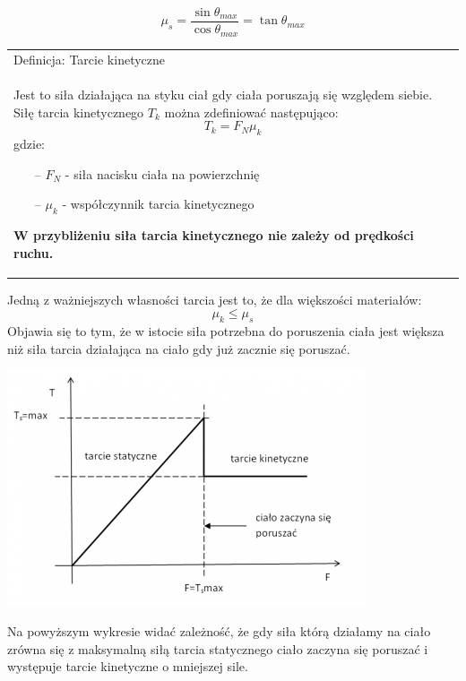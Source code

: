 \documentclass[a4paper]{article}
\newenvironment{definition}[2][Definicja]
    {
        \begin{center}
        \begin{tabular}{|p{1\textwidth}|}
        \hline
            #1: #2\\[2ex]
        \begin{em}
        \Large
    }
    { 
        \end{em}
        \\\hline
        \end{tabular} 
        \end{center}
    }
\begin{document}
    \[\mu_s = \frac{\sin \theta_{max}}{\cos \theta_{max}} = \tan{\theta_{max}}\] 
    \begin{definition}{Tarcie kinetyczne}
        Jest to siła działająca na styku ciał gdy ciała poruszają się względem siebie. Siłę 
        tarcia kinetycznego $T_k$ można zdefiniować następująco:
        \[T_k = F_N\mu_k\]
        gdzie:
        \begin{itemize}
            \item[--] $F_N$ - siła nacisku ciała na powierzchnię
            \item[--] $\mu_k$ - współczynnik tarcia kinetycznego 
        \end{itemize}

        \textbf{W przybliżeniu siła tarcia kinetycznego nie zależy od prędkości ruchu.}
    \end{definition}
    Jedną z ważniejszych własności tarcia jest to, że dla większości materiałów:
    \[\mu_k \leq \mu_s\]
    Objawia się to tym, że w istocie siła potrzebna do poruszenia ciała jest większa niż 
    siła tarcia działająca na ciało gdy już zacznie się poruszać.
    \begin{center}
        \includegraphics{img/tarcie.png}
    \end{center}
    Na powyższym wykresie widać zależność, że gdy siła którą działamy na ciało zrówna się 
    z maksymalną siłą tarcia statycznego ciało zaczyna się poruszać i występuje tarcie kinetyczne
    o mniejszej sile.
    
\end{document}
